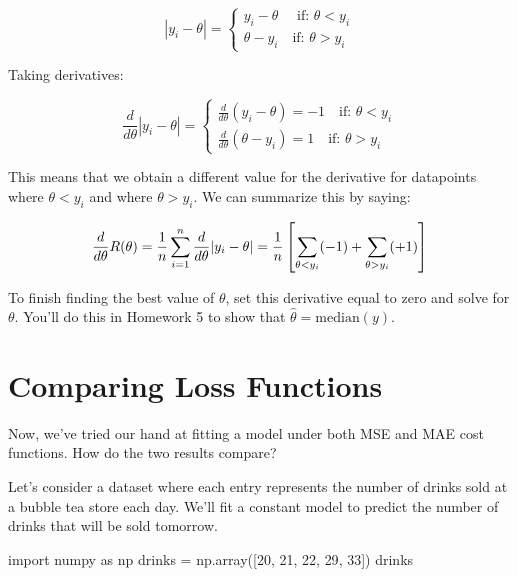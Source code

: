 \documentclass[
  letterpaper,
  DIV=11,
  numbers=noendperiod]{scrreprt}
\newenvironment{Shaded}{\begin{snugshade}}{\end{snugshade}}
\newcommand{\DecValTok}[1]{\textcolor[rgb]{0.68,0.00,0.00}{#1}}
\newcommand{\ImportTok}[1]{\textcolor[rgb]{0.00,0.46,0.62}{#1}}
\newcommand{\NormalTok}[1]{\textcolor[rgb]{0.00,0.23,0.31}{#1}}
\newcommand{\OperatorTok}[1]{\textcolor[rgb]{0.37,0.37,0.37}{#1}}
\begin{document}
\[|y_i - \theta| = \begin{cases} y_i - \theta \quad \text{ if: } \theta < y_i \\ \theta - y_i \quad \text{if: }\theta > y_i \end{cases}\]

Taking derivatives:

\[\frac{d}{d\theta} |y_i - \theta| = \begin{cases} \frac{d}{d\theta} (y_i - \theta) = -1 \quad \text{if: }\theta < y_i \\ \frac{d}{d\theta} (\theta - y_i) = 1 \quad \text{if: }\theta > y_i \end{cases}\]

This means that we obtain a different value for the derivative for
datapoints where \(\theta < y_i\) and where \(\theta > y_i\). We can
summarize this by saying:

\[\frac{d}{d\theta} R(\theta) = \frac{1}{n} \sum^{n}_{i=1} \frac{d}{d\theta} |y_i - \theta| \\
= \frac{1}{n} \left[\sum_{\theta < y_i} (-1) + \sum_{\theta > y_i} (+1) \right]
\]

To finish finding the best value of \(\theta\), set this derivative
equal to zero and solve for \(\theta\). You'll do this in Homework 5 to
show that \(\hat{\theta} = \text{median}(y)\).

\hypertarget{comparing-loss-functions}{%
\section{Comparing Loss Functions}\label{comparing-loss-functions}}

Now, we've tried our hand at fitting a model under both MSE and MAE cost
functions. How do the two results compare?

Let's consider a dataset where each entry represents the number of
drinks sold at a bubble tea store each day. We'll fit a constant model
to predict the number of drinks that will be sold tomorrow.

\begin{Shaded}
\begin{Highlighting}[]
\ImportTok{import}\NormalTok{ numpy }\ImportTok{as}\NormalTok{ np}
\NormalTok{drinks }\OperatorTok{=}\NormalTok{ np.array([}\DecValTok{20}\NormalTok{, }\DecValTok{21}\NormalTok{, }\DecValTok{22}\NormalTok{, }\DecValTok{29}\NormalTok{, }\DecValTok{33}\NormalTok{])}
\NormalTok{drinks}
\end{Highlighting}
\end{Shaded}
\end{document}
